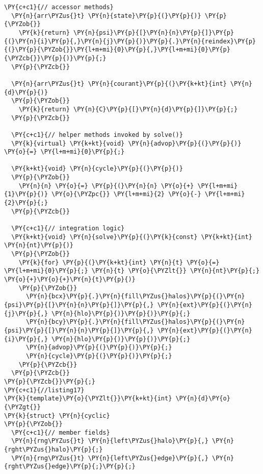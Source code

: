 \begin{Verbatim}[commandchars=\\\{\}]
  \PY{c+c1}{// accessor methods}
  \PY{n}{arr\PYZus{}t} \PY{n}{state}\PY{p}{(}\PY{p}{)} \PY{p}{\PYZob{}}
    \PY{k}{return} \PY{n}{psi}\PY{p}{[}\PY{n}{n}\PY{p}{]}\PY{p}{(}\PY{n}{i}\PY{p}{,}\PY{n}{j}\PY{p}{)}\PY{p}{.}\PY{n}{reindex}\PY{p}{(}\PY{p}{\PYZob{}}\PY{l+m+mi}{0}\PY{p}{,}\PY{l+m+mi}{0}\PY{p}{\PYZcb{}}\PY{p}{)}\PY{p}{;}
  \PY{p}{\PYZcb{}}

  \PY{n}{arr\PYZus{}t} \PY{n}{courant}\PY{p}{(}\PY{k+kt}{int} \PY{n}{d}\PY{p}{)} 
  \PY{p}{\PYZob{}} 
    \PY{k}{return} \PY{n}{C}\PY{p}{[}\PY{n}{d}\PY{p}{]}\PY{p}{;} 
  \PY{p}{\PYZcb{}}

  \PY{c+c1}{// helper methods invoked by solve()}
  \PY{k}{virtual} \PY{k+kt}{void} \PY{n}{advop}\PY{p}{(}\PY{p}{)} \PY{o}{=} \PY{l+m+mi}{0}\PY{p}{;}

  \PY{k+kt}{void} \PY{n}{cycle}\PY{p}{(}\PY{p}{)} 
  \PY{p}{\PYZob{}} 
    \PY{n}{n} \PY{o}{=} \PY{p}{(}\PY{n}{n} \PY{o}{+} \PY{l+m+mi}{1}\PY{p}{)} \PY{o}{\PYZpc{}} \PY{l+m+mi}{2} \PY{o}{-} \PY{l+m+mi}{2}\PY{p}{;} 
  \PY{p}{\PYZcb{}}

  \PY{c+c1}{// integration logic}
  \PY{k+kt}{void} \PY{n}{solve}\PY{p}{(}\PY{k}{const} \PY{k+kt}{int} \PY{n}{nt}\PY{p}{)} 
  \PY{p}{\PYZob{}}
    \PY{k}{for} \PY{p}{(}\PY{k+kt}{int} \PY{n}{t} \PY{o}{=} \PY{l+m+mi}{0}\PY{p}{;} \PY{n}{t} \PY{o}{\PYZlt{}} \PY{n}{nt}\PY{p}{;} \PY{o}{+}\PY{o}{+}\PY{n}{t}\PY{p}{)} 
    \PY{p}{\PYZob{}}
      \PY{n}{bcx}\PY{p}{.}\PY{n}{fill\PYZus{}halos}\PY{p}{(}\PY{n}{psi}\PY{p}{[}\PY{n}{n}\PY{p}{]}\PY{p}{,} \PY{n}{ext}\PY{p}{(}\PY{n}{j}\PY{p}{,} \PY{n}{hlo}\PY{p}{)}\PY{p}{)}\PY{p}{;}
      \PY{n}{bcy}\PY{p}{.}\PY{n}{fill\PYZus{}halos}\PY{p}{(}\PY{n}{psi}\PY{p}{[}\PY{n}{n}\PY{p}{]}\PY{p}{,} \PY{n}{ext}\PY{p}{(}\PY{n}{i}\PY{p}{,} \PY{n}{hlo}\PY{p}{)}\PY{p}{)}\PY{p}{;}
      \PY{n}{advop}\PY{p}{(}\PY{p}{)}\PY{p}{;}
      \PY{n}{cycle}\PY{p}{(}\PY{p}{)}\PY{p}{;}
    \PY{p}{\PYZcb{}}
  \PY{p}{\PYZcb{}}
\PY{p}{\PYZcb{}}\PY{p}{;}
\PY{c+c1}{//listing17}
\PY{k}{template}\PY{o}{\PYZlt{}}\PY{k+kt}{int} \PY{n}{d}\PY{o}{\PYZgt{}}
\PY{k}{struct} \PY{n}{cyclic}
\PY{p}{\PYZob{}}
  \PY{c+c1}{// member fields}
  \PY{n}{rng\PYZus{}t} \PY{n}{left\PYZus{}halo}\PY{p}{,} \PY{n}{rght\PYZus{}halo}\PY{p}{;}
  \PY{n}{rng\PYZus{}t} \PY{n}{left\PYZus{}edge}\PY{p}{,} \PY{n}{rght\PYZus{}edge}\PY{p}{;}\PY{p}{;}


\end{Verbatim}
